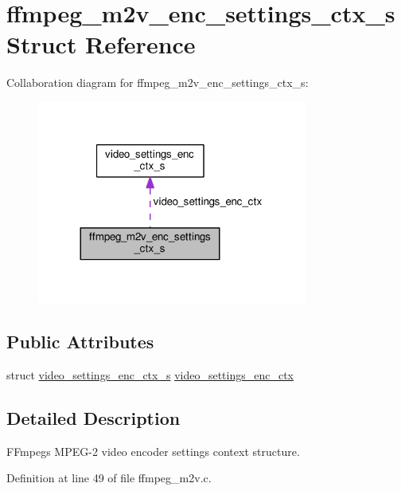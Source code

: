 \hypertarget{structffmpeg__m2v__enc__settings__ctx__s}{}\section{ffmpeg\+\_\+m2v\+\_\+enc\+\_\+settings\+\_\+ctx\+\_\+s Struct Reference}
\label{structffmpeg__m2v__enc__settings__ctx__s}


Collaboration diagram for ffmpeg\+\_\+m2v\+\_\+enc\+\_\+settings\+\_\+ctx\+\_\+s\+:\nopagebreak
\begin{figure}[H]
\begin{center}
\leavevmode
\includegraphics[width=252pt]{structffmpeg__m2v__enc__settings__ctx__s__coll__graph}
\end{center}
\end{figure}
\subsection*{Public Attributes}
\begin{DoxyCompactItemize}
\item 
struct \hyperlink{structvideo__settings__enc__ctx__s}{video\+\_\+settings\+\_\+enc\+\_\+ctx\+\_\+s} \hyperlink{structffmpeg__m2v__enc__settings__ctx__s_a15787044210ce107442c4e08a3f884b8}{video\+\_\+settings\+\_\+enc\+\_\+ctx}
\end{DoxyCompactItemize}


\subsection{Detailed Description}
F\+Fmpeg\textquotesingle{}s M\+P\+E\+G-\/2 video encoder settings context structure. 

Definition at line 49 of file ffmpeg\+\_\+m2v.\+c.



